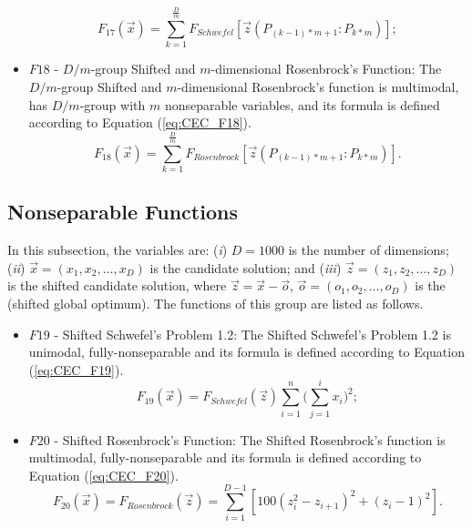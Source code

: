 \begin{itemize}
      \begin{equation}\label{eq:CEC_F17}
      F_{17}(\vec{x}) = \sum_{k=1}^{\frac{D}{m}}F_{Schwefel}[\vec{z}(P_{(k-1) \ast m+1}:P_{k \ast m})];
      \end{equation}
  \item $F18$ - $D/m$-group Shifted and $m$-dimensional Rosenbrock's Function: The $D/m$-group Shifted and $m$-dimensional Rosenbrock's function is multimodal, has $D/m$-group with $m$ nonseparable variables, and its formula is defined according to Equation (\ref{eq:CEC_F18}).
      \begin{equation}\label{eq:CEC_F18}
      F_{18}(\vec{x}) = \sum_{k=1}^{\frac{D}{m}}F_{Rosenbrock}[\vec{z}(P_{(k-1) \ast m+1}:P_{k \ast m})].
      \end{equation}
\end{itemize}

\subsection{Nonseparable Functions}
In this subsection, the variables are: (\emph{i}) $D = 1000$ is the number of dimensions; (\emph{ii}) $\vec{x} = (x_1, x_2, \ldots, x_D)$ is the candidate solution; and (\emph{iii}) $\vec{z} = (z_1, z_2, \ldots, z_D)$ is the shifted candidate solution, where $\vec{z} = \vec{x} - \vec{o}$, $\vec{o} = (o_1, o_2, \ldots, o_D)$ is the (shifted global optimum). The functions of this group are listed as follows.

\begin{itemize}
  \item $F19$ - Shifted Schwefel's Problem 1.2: The Shifted Schwefel's Problem 1.2 is unimodal, fully-nonseparable and its formula is defined according to Equation (\ref{eq:CEC_F19}).
      \begin{equation}\label{eq:CEC_F19}
      F_{19}(\vec{x}) = F_{Schwefel}(\vec{z})\sum_{i=1}^{n}\Biggl(\sum_{j=1}^{i}x_i \Biggr)^2;
      \end{equation}
  \item $F20$ - Shifted Rosenbrock's Function: The Shifted Rosenbrock's function is multimodal, fully-nonseparable and its formula is defined according to Equation (\ref{eq:CEC_F20}).
      \begin{equation}\label{eq:CEC_F20}
      F_{20}(\vec{x}) = F_{Rosenbrock}(\vec{z}) = \sum_{i=1}^{D-1}[100(z_i^2 - z_{i+1})^2 + (z_i - 1)^2].
      \end{equation}
\end{itemize}
    
